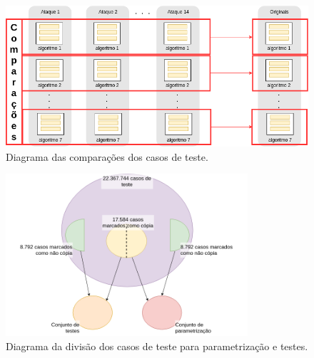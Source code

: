 \begin{figure}[h]
    \centering
    \caption{Diagrama das comparações dos casos de teste.}
    \label{fig:comparacao}
    \includegraphics[width=1.0\textwidth]{dados/figuras/Comparador-1}
\end{figure}

\begin{figure}[h]
    \centering
    \caption{Diagrama da divisão dos casos de teste para parametrização e testes.}
    \label{fig:casosteste}
  
    \includegraphics[width=0.8\textwidth]{dados/figuras/Casos}
    
    
\end{figure}




